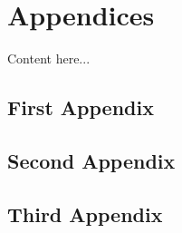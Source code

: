 
\chapter*{Appendices}
\hypertarget{appendices}{}  %

\renewcommand{\thesection}{\Alph{section}}


Content here...

\section{First Appendix}
\section{Second Appendix}
\section{Third Appendix}